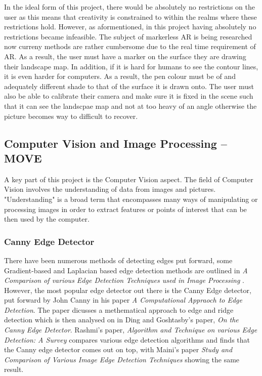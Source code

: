 \documentclass[11pt]{article}
\begin{document}
In the ideal form of this project, there would be absolutely no
restrictions on the user as this means that creativity is constrained
to within the realms where these restrictions hold. However, as 
aformentioned, in this project having absolutely no restrictions became
infeasible. The subject of markerless AR is being researched now curreny 
methods are rather cumbersome due to the real time requirement of AR. As
a result, the user must have a marker on the surface they are drawing their
landscape map. In addition, if it is hard for humans to see the contour
lines, it is even harder for computers. As a result, the pen colour must
be of and adequately different shade to that of the surface it is drawn onto.
The user must also be able to calibrate their camera and make sure it
is fixed in the scene such that it can see the landscpae map and not at
too heavy of an angle otherwise the picture becomes way to difficult to 
recover.








\subsection{Computer Vision and Image Processing -- MOVE}
A key part of this project is the Computer Vision aspect. The field of
Computer Vision involves the understanding of data from images and pictures.
"Understanding" is a broad term that encompasses many ways of manipulating or
processing images in order to extract features or points of interest that
can be then used by the computer.



\subsubsection{Canny Edge Detector}
\label{sec:Canny}

There have been numerous methods of detecting edges put forward,
some Gradient-based and Laplacian based edge detection methods are 
outlined in 
\textit{A Comparison of various Edge Detection Techniques used in Image Processing}
\cite{Shriv12}. However, the most popular edge detector out there is the
Canny Edge detector, put forward by John Canny in his paper
\textit{A Computational Appraoch to Edge Detection}\cite{Canny86}. The paper
dicusses a methematical approach to edge and ridge detection which is then
analysed on in Ding and Goshtasby's paper, 
\textit{On the Canny Edge Detector}\cite{Ding00}. Rashmi's paper,
\textit{Algorithm and Technique on various Edge Detection: A Survey}
\cite{Rashmi13} compares various edge detection algorithms and finds that 
the Canny edge detector comes out on top, with Maini's paper 
\textit{Study and Comparison of Various Image Edge Detection Techniques} 
\cite{Maini} showing the same result.
\end{document}

